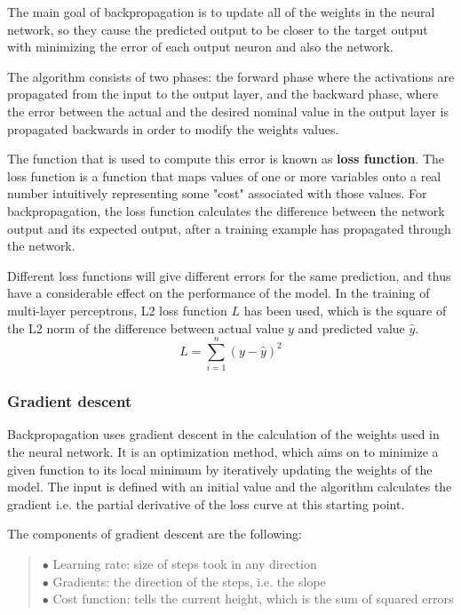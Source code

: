 The main goal of backpropagation is to update all of the weights in the neural network, so they cause the predicted output to be closer to the target output with minimizing the error of each output neuron and also the network. \medskip

The algorithm consists of two phases: the forward phase where the activations are propagated from the input to the output layer, and the backward phase, where the error between the actual and the desired nominal value in the output layer is propagated backwards in order to modify the weights values. \medskip

The function that is used to compute this error is known as \textbf{loss function}. The loss function is a function that maps values of one or more variables onto a real number intuitively representing some "cost" associated with those values. For backpropagation, the loss function calculates the difference between the network output and its expected output, after a training example has propagated through the network. \smallskip

Different loss functions will give different errors for the same prediction, and thus have a considerable effect on the performance of the model. In the training of multi-layer perceptrons, L2 loss function $L$ has been used, which is the square of the L2 norm of the difference between actual value $y$ and predicted value $\hat{y}$.
$$ L = \sum^n_{i=1}(y - \hat{y})^2 $$



\subsubsection{Gradient descent}

Backpropagation uses gradient descent in the calculation of the weights used in the neural network. It is an optimization method, which aims on to minimize a given function to its local minimum by iteratively updating the weights of the model. The input is defined with an initial value and the algorithm calculates the gradient i.e. the partial derivative of the loss curve at this starting point. \smallskip

\noindent The components of gradient descent are the following:
\begin{verse}
	$\bullet$ Learning rate: size of steps took in any direction\\
	$\bullet$ Gradients: the direction of the steps, i.e. the slope\\
	$\bullet$ Cost function: tells the current height, which is the sum of squared errors
\end{verse}

